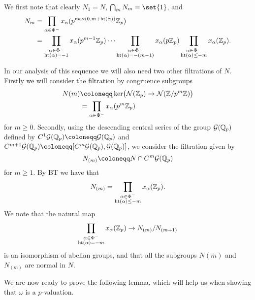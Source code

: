 We first note that clearly $N_1 = N$, $\bigcap_m N_m = \set{1}$, and
\begin{equation}
  \label{eq:N_m}
  \begin{split}
    N_m &= \prod_{\alpha \in \Phi^{-}} x_\alpha(p^{\max(0,m+\operatorname{ht}(\alpha))} \mathbb{Z}_p) \\
    &= \prod_{\substack{\alpha\in \Phi^{-} \\ \operatorname{ht}(\alpha) = -1}} x_\alpha(p^{m-1} \mathbb{Z}_p) \dotsb \prod_{\substack{\alpha\in \Phi^{-} \\ \operatorname{ht}(\alpha) = -(m-1)}} x_\alpha(p\mathbb{Z}_p) \prod_{\substack{\alpha\in \Phi^{-} \\ \operatorname{ht}(\alpha) \leq -m}} x_\alpha(\mathbb{Z}_p).
  \end{split}
\end{equation}

In our analysis of this sequence we will also need two other filtrations of $N$. Firstly we will consider the filtration by congruence subgroups
\begin{equation}
  \label{eq:N(m)}
  \begin{split}
    N(m) &\coloneqq \ker\bigl( \gs{N}(\Z_p) \to \gs{N}(\Z/p^m\Z) \bigr) \\
    &= \prod_{\alpha \in \Phi^{-}} x_\alpha(p^m\Z_p)
  \end{split}
\end{equation}
for $m \geq 0$. Secondly, using the descending central series of the group $\mathcal{G}(\mathbb{Q}_p)$ defined by $C^1\gs{G}(\Q_p) \coloneqq \gs{G}(\Q_p)$ and $C^{m+1} \gs{G}(\Q_p) \coloneqq [C^m \gs{G}(\Q_p),\gs{G}(\Q_p)]$, we consider the filtration given by
\begin{equation*}
    N_{(m)} \coloneqq N \cap C^m \gs{G}(\Q_p)
\end{equation*}
for $m \geq 1$. By BT we have that
\begin{equation}
  \label{eq:N_(m)}
    N_{(m)} = \prod_{\substack{\alpha \in \Phi^{-} \\ \operatorname{ht}(\alpha) \leq -m}} x_\alpha(\mathbb{Z}_p).
\end{equation}
We note that the natural map
\begin{equation*}
  \prod_{\substack{\alpha\in \Phi^{-} \\ \operatorname{ht}(\alpha) = -m}} x_\alpha(\mathbb{Z}_p) \to N_{(m)}/N_{(m+1)}
\end{equation*}
is an isomorphism of abelian groups, and that all the subgroups $N(m)$ and $N_{(m)}$ are normal in $N$.

We are now ready to prove the following lemma, which will help us when showing that $\omega$ is a $p$-valuation.

